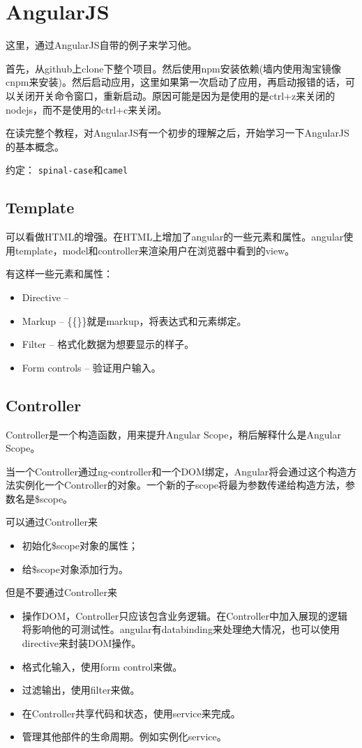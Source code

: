 \section{AngularJS}
这里，通过AngularJS自带的例子来学习他。

首先，从github上clone下整个项目。然后使用npm安装依赖(墙内使用淘宝镜像cnpm来安装)。然后启动应用，这里如果第一次启动了应用，再启动报错的话，可以关闭开关命令窗口，重新启动。原因可能是因为是使用的是ctrl+z来关闭的nodejs，而不是使用的ctrl+c来关闭。

在读完整个教程，对AngularJS有一个初步的理解之后，开始学习一下AngularJS的基本概念。


约定： \lstinline$spinal-case$和\lstinline$camel$


\subsection{Template}
可以看做HTML的增强。在HTML上增加了angular的一些元素和属性。angular使用template，model和controller来渲染用户在浏览器中看到的view。

有这样一些元素和属性：
\begin{itemize}
\item Directive --
\item Markup -- \{\{\}\}就是markup，将表达式和元素绑定。
\item Filter -- 格式化数据为想要显示的样子。
\item Form controls -- 验证用户输入。
\end{itemize}


\subsection{Controller}

Controller是一个构造函数，用来提升Angular Scope，稍后解释什么是Angular Scope。

当一个Controller通过ng-controller和一个DOM绑定，Angular将会通过这个构造方法实例化一个Controller的对象。一个新的子scope将最为参数传递给构造方法，参数名是\$scope。

可以通过Controller来
\begin{itemize}
\item 初始化\$scope对象的属性；
\item 给\$scope对象添加行为。
\end{itemize}

但是不要通过Controller来
\begin{itemize}
\item 操作DOM，Controller只应该包含业务逻辑。在Controller中加入展现的逻辑将影响他的可测试性。angular有databinding来处理绝大情况，也可以使用directive来封装DOM操作。
\item 格式化输入，使用form control来做。
\item 过滤输出，使用filter来做。
\item 在Controller共享代码和状态，使用service来完成。
\item 管理其他部件的生命周期。例如实例化service。
\end{itemize}

